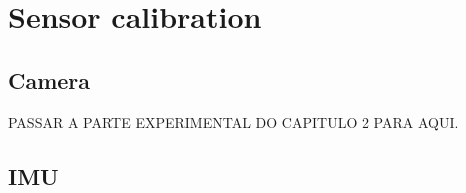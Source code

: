 \section{Sensor calibration}
\label{sec:sec3_calibration}

\subsection{Camera}
\label{sec:sec3_cam_calib}

PASSAR A PARTE EXPERIMENTAL DO CAPITULO 2 PARA AQUI.

\subsection{IMU}
\label{sec:sec3_imu_calib}